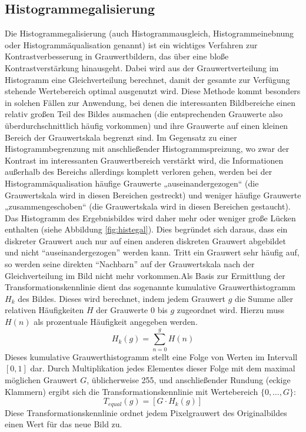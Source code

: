 \clearpage

\subsection{Histogrammegalisierung}
\label{sec:histo}
Die Histogrammegalisierung (auch Histogrammausgleich, Histogrammeinebnung oder Histogrammäqualisation genannt) ist ein wichtiges Verfahren zur Kontrastverbesserung in Grauwertbildern, das über eine bloße Kontrastverstärkung hinausgeht. Dabei wird aus der Grauwertverteilung im Histogramm eine Gleichverteilung berechnet, damit der gesamte zur Verfügung stehende Wertebereich optimal ausgenutzt wird. Diese Methode kommt besonders in solchen Fällen zur Anwendung, bei denen die interessanten Bildbereiche einen relativ großen Teil des Bildes ausmachen (die entsprechenden Grauwerte also überdurchschnittlich häufig vorkommen) und ihre Grauwerte auf einen kleinen Bereich der Grauwertskala begrenzt sind. Im Gegensatz zu einer Histogrammbegrenzung mit anschließender Histogrammspreizung, wo zwar der Kontrast im interessanten Grauwertbereich verstärkt wird, die Informationen außerhalb des Bereichs allerdings komplett verloren gehen, werden bei der Histogrammäqualisation häufige Grauwerte „auseinandergezogen“ (die Grauwertskala wird in diesen Bereichen gestreckt) und weniger häufige Grauwerte „zusammengeschoben“ (die Grauwertskala wird in diesen Bereichen gestaucht). Das Histogramm des Ergebnisbildes wird daher mehr oder weniger große Lücken enthalten (siehe Abbildung \ref{fig:histegal}). Dies begründet sich daraus, dass ein diskreter Grauwert auch nur auf einen anderen diskreten Grauwert abgebildet und nicht "`auseinandergezogen"' werden kann. Tritt ein Grauwert sehr häufig auf, so werden seine direkten "`Nachbarn"' auf der Grauwertskala nach der Gleichverteilung im Bild nicht mehr vorkommen.Als Basis zur Ermittlung der Transformationskennlinie dient das sogenannte kumulative Grauwerthistogramm $H_{k}$ des Bildes. Dieses wird berechnet, indem jedem Grauwert $g$ die Summe aller relativen Häufigkeiten $H$ der Grauwerte $0$ bis $g$ zugeordnet wird. Hierzu muss $H(n)$ als prozentuale Häufigkeit angegeben werden.
\begin{equation}
H_{k}(g)=\sum_{n=0}^{g}H(n)
\end{equation}
Dieses kumulative Grauwerthistogramm stellt eine Folge von Werten im Intervall $[0,1]$ dar. Durch Multiplikation jedes Elementes dieser Folge mit dem maximal möglichen Grauwert $G$, üblicherweise 255, und anschließender Rundung (eckige Klammern) ergibt sich die Transformationskennlinie mit Wertebereich $\lbrace0,\ldots,G\rbrace$:
\begin{equation}
T_{equal}(g)=\left\lbrack G\cdot H_k(g)\right\rbrack
\end{equation}
Diese Transformationskennlinie ordnet jedem Pixelgrauwert des Originalbildes einen Wert für das neue Bild zu.

